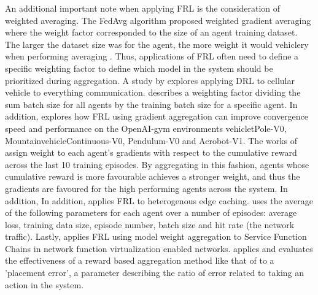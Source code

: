 An additional important note when applying FRL is the consideration of weighted averaging. 
The FedAvg \cite{BrendanMcMahan2017a} algorithm proposed weighted gradient averaging where the weight factor corresponded to the size of an agent training dataset.  The larger the dataset size was for the agent, the more weight it would vehiclery when performing averaging \cite{BrendanMcMahan2017a}.  Thus, applications of FRL often need to define a specific weighting factor to define which model in the system should be prioritized during aggregation.  A study by \cite{ZhangX2020} explores applying DRL to cellular vehicle to everything communication. \cite{ZhangX2020} describes a weighting factor dividing the sum batch size for all agents  by the training batch size for a specific agent.  In addition, \cite{LimHyun2021} explores how FRL using gradient aggregation can improve convergence speed and performance on the OpenAI-gym environments vehicletPole-V0, MountainvehicleContinuous-V0, Pendulum-V0 and Acrobot-V1. The works of \cite{LimHyun2021} assign weight to each agent's gradients with respect to the cumulative reward across the last 10 training episodes. By aggregating in this fashion, agents whose cumulative reward is more favourable achieves a stronger weight, and thus the gradients are favoured for the high performing agents across the system.  In addition, In addition, \cite{WangXiaofei2021} applies FRL to heterogenous edge caching.  \cite{WangXiaofei2021} uses the average of the following parameters for each agent over a number of episodes: average loss, training data size, episode number, batch size and hit rate (the network traffic). Lastly, \cite{Huang2021} applies FRL using model weight aggregation to Service Function Chains in network function virtualization enabled networks.  \cite{Huang2021} applies and evaluates the effectiveness of a reward based aggregation method like that of \cite{WangXiaofei2021} to a 'placement error', a parameter describing the ratio of error related to taking an action in the system.
